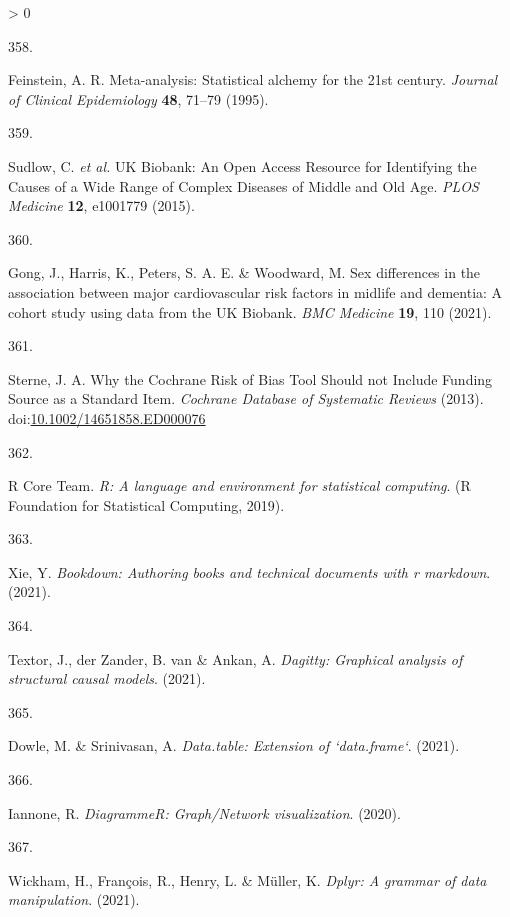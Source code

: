\documentclass[a4paper, twoside]{templates/ociamthesis}
\newlength{\cslhangindent}
\newlength{\csllabelwidth}
\newenvironment{CSLReferences}[3] %
 {%
  \setlength{\parindent}{0pt}
  \ifodd #1 \everypar{\setlength{\hangindent}{\cslhangindent}}\ignorespaces\fi
  \ifnum #2 > 0
  \setlength{\parskip}{#2\baselineskip}
  \fi
 }%
 {}
\newcommand{\CSLLeftMargin}[1]{\parbox[t]{\maxof{\widthof{#1}}{\csllabelwidth}}{#1}}
\newcommand{\CSLRightInline}[1]{\parbox[t]{\linewidth - \csllabelwidth}{#1}}
\begin{document}
\begin{CSLReferences}{0}{0}
\leavevmode\hypertarget{ref-feinstein1995}{}%
\CSLLeftMargin{358. }
\CSLRightInline{Feinstein, A. R. Meta-analysis: Statistical alchemy for the 21st century. \emph{Journal of Clinical Epidemiology} \textbf{48}, 71--79 (1995).}

\leavevmode\hypertarget{ref-sudlow2015}{}%
\CSLLeftMargin{359. }
\CSLRightInline{Sudlow, C. \emph{et al.} {UK Biobank}: An {Open Access Resource} for {Identifying} the {Causes} of a {Wide Range} of {Complex Diseases} of {Middle} and {Old Age}. \emph{PLOS Medicine} \textbf{12}, e1001779 (2015).}

\leavevmode\hypertarget{ref-gong2021}{}%
\CSLLeftMargin{360. }
\CSLRightInline{Gong, J., Harris, K., Peters, S. A. E. \& Woodward, M. Sex differences in the association between major cardiovascular risk factors in midlife and dementia: A cohort study using data from the {UK Biobank}. \emph{BMC Medicine} \textbf{19}, 110 (2021).}

\leavevmode\hypertarget{ref-sterne2013}{}%
\CSLLeftMargin{361. }
\CSLRightInline{Sterne, J. A. Why the {Cochrane Risk} of {Bias Tool Should} not {Include Funding Source} as a {Standard Item}. \emph{Cochrane Database of Systematic Reviews} (2013). doi:\href{https://doi.org/10.1002/14651858.ED000076}{10.1002/14651858.ED000076}}

\leavevmode\hypertarget{ref-R-base}{}%
\CSLLeftMargin{362. }
\CSLRightInline{R Core Team. \emph{R: A language and environment for statistical computing}. ({R Foundation for Statistical Computing}, 2019).}

\leavevmode\hypertarget{ref-R-bookdown}{}%
\CSLLeftMargin{363. }
\CSLRightInline{Xie, Y. \emph{Bookdown: Authoring books and technical documents with r markdown}. (2021).}

\leavevmode\hypertarget{ref-R-dagitty}{}%
\CSLLeftMargin{364. }
\CSLRightInline{Textor, J., der Zander, B. van \& Ankan, A. \emph{Dagitty: Graphical analysis of structural causal models}. (2021).}

\leavevmode\hypertarget{ref-R-data.table}{}%
\CSLLeftMargin{365. }
\CSLRightInline{Dowle, M. \& Srinivasan, A. \emph{Data.table: Extension of `data.frame`}. (2021).}

\leavevmode\hypertarget{ref-R-DiagrammeR}{}%
\CSLLeftMargin{366. }
\CSLRightInline{Iannone, R. \emph{{DiagrammeR}: Graph/{Network} visualization}. (2020).}

\leavevmode\hypertarget{ref-R-dplyr}{}%
\CSLLeftMargin{367. }
\CSLRightInline{Wickham, H., François, R., Henry, L. \& Müller, K. \emph{Dplyr: A grammar of data manipulation}. (2021).}


\end{CSLReferences}
\end{document}
